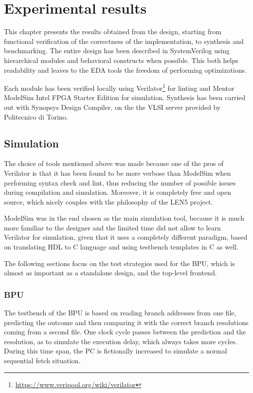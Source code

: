 \chapter{Experimental results}
This chapter presents the results obtained from the design, starting from functional verification of the correctness of the implementation, to synthesis and benchmarking. The entire design has been described in SystemVerilog using hierarchical modules and behavioral constructs when possible. This both helps readability and leaves to the EDA tools the freedom of performing optimizations.

Each module has been verified locally using Verilator\footnote{\url{https://www.veripool.org/wiki/verilator}} for linting and Mentor ModelSim Intel FPGA Starter Edition for simulation. Synthesis has been carried out with Synopsys Design Compiler, on the the VLSI server provided by Politecnico di Torino.

\section{Simulation}
The choice of tools mentioned above was made because one of the pros of Verilator is that it has been found to be more verbose than ModelSim when performing syntax check and lint, thus reducing the number of possible issues during compilation and simulation. Moreover, it is completely free and open source, which nicely couples with the philosophy of the LEN5 project.

ModelSim was in the end chosen as the main simulation tool, because it is much more familiar to the designer and the limited time did not allow to learn Verilator for simulation, given that it uses a completely different paradigm, based on translating HDL to C language and using testbench templates in C as well.

The following sections focus on the test strategies used for the \ac{BPU}, which is almost as important as a standalone design, and the top-level frontend.

\subsection{\acs{BPU}}
The testbench of the \ac{BPU} is based on reading branch addresses from one file, predicting the outcome and then comparing it with the correct branch resolutions coming from a second file. One clock cycle passes between the prediction and the resolution, as to simulate the execution delay, which always takes more cycles. During this time span, the \ac{PC} is fictionally increased to simulate a normal sequential fetch situation.

